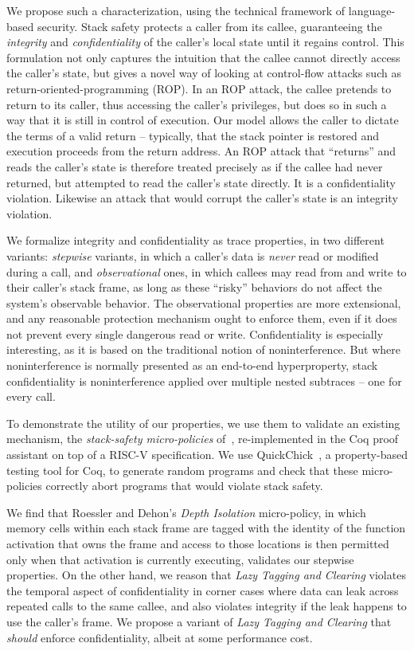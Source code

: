 \documentclass[acmtog,review,anonymous]{acmart}\settopmatter{printfolios=true,printccs=false,printacmref=false}
\begin{document}
We propose such a characterization,
using the technical framework of language-based security.
Stack safety protects a caller from its callee, guaranteeing
the {\em integrity} and {\em confidentiality} of the caller's local state
until it regains control. This formulation not only captures the intuition
that the callee cannot directly access the caller's state, but gives a novel
way of looking at control-flow attacks such as return-oriented-programming (ROP).
In an ROP attack, the callee pretends to return to its caller, thus accessing the
caller's privileges, but does so in such a way that it is still in control of
execution. Our model allows the caller to dictate the terms of a valid return --
typically, that the stack pointer is restored and execution proceeds from the
return address. An ROP attack that ``returns'' and reads the caller's state is
therefore treated precisely as if the callee had never returned, but attempted
to read the caller's state directly. It is a confidentiality violation. Likewise
an attack that would corrupt the caller's state is an integrity violation.

We formalize integrity and confidentiality as trace properties, in two different
variants: {\em stepwise} variants, in which a caller's data is {\em never}
read or modified during a call, and {\em observational} ones, in which
callees may read from and write to their caller's stack frame, as
long as these ``risky'' behaviors do not affect the system's observable
behavior. The observational properties are more extensional, and
any reasonable protection mechanism ought to enforce them,
even if it does not prevent every single dangerous read or write.
Confidentiality is especially interesting, as it is based on the traditional
notion of noninterference. But where noninterference is normally presented as an
end-to-end hyperproperty, stack confidentiality is noninterference applied over
multiple nested subtraces -- one for every call.

To demonstrate the utility of our properties, we use them
to validate an existing mechanism, the
{\em stack-safety micro-policies} of~\citet{DBLP:conf/sp/RoesslerD18}, re-implemented
in the Coq proof assistant on top of a RISC-V specification. We
use QuickChick~\citep{Denes:VSL2014,Pierce:SF4}, a property-based testing
tool for Coq, to generate random programs and check
that these micro-policies correctly abort programs that
would violate stack safety.

We find that Roessler and Dehon's {\em Depth Isolation} micro-policy, in
which memory cells within each stack frame are tagged with the identity of
the function activation that owns the frame and access to those locations is
then permitted only when that activation is currently executing, validates our
stepwise properties. On the other hand, we reason that \emph{Lazy Tagging and Clearing}
violates the temporal aspect of confidentiality in
corner cases where data can leak across repeated calls to the same callee,
and also violates integrity if the leak happens to use the caller's frame. We
propose a variant of {\em Lazy Tagging and Clearing} that \emph{should} enforce
confidentiality, albeit at some performance cost.
\end{document}
